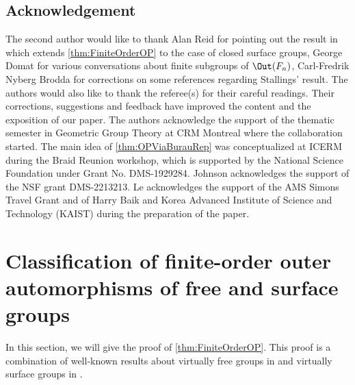 \documentclass{amsart}
\begin{document}
\subsection{Acknowledgement} The second author would like to thank Alan Reid for pointing out the result in \cite{Eckmann84} which extends \cref{thm:FiniteOrderOP} to the case of closed surface groups, George Domat for various conversations about finite subgroups of $\Out(F_n)$, Carl-Fredrik Nyberg Brodda for corrections on some references regarding Stallings' result. The authors would also like to thank the referee(s) for their careful readings. Their corrections, suggestions and feedback have improved the content and the exposition of our paper. The authors acknowledge the support of the thematic semester in Geometric Group Theory at CRM Montreal where the collaboration started.
The main idea of \cref{thm:OPViaBurauRep} was conceptualized at ICERM during the Braid Reunion workshop, which is supported by the National Science Foundation under Grant No. DMS-1929284.
Johnson acknowledges the support of the NSF grant DMS-2213213.
Le acknowledges the support of the AMS Simons Travel Grant and of Harry Baik and Korea Advanced Institute of Science and Technology (KAIST) during the preparation of the paper.  

\section{Classification of finite-order outer automorphisms of free and surface groups}
\label{sec:FiniteGroupOP}
In this section, we will give the proof of \cref{thm:FiniteOrderOP}. This proof is a combination of well-known results about virtually free groups in \cite{Stallings68} and virtually surface groups in \cite{Eckmann84}. 
\end{document}

